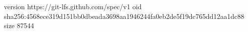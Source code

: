 version https://git-lfs.github.com/spec/v1
oid sha256:4568ece319d151bb0dbeada3698aa1946244fa0eb2de5f19dc765dd12aa1dc88
size 87544
